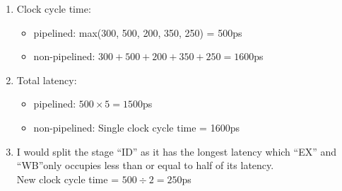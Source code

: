 \documentclass[12pt, a4paper]{article}
\begin{document}
\begin{ans}
    \begin{enumerate}
        \item Clock cycle time: 
            \begin{itemize}
                \item pipelined: max(300, 500, 200, 350, 250) = 500ps
                \item non-pipelined: $300+500+200+350+250=1600$ps
            \end{itemize}
        \item Total latency: 
            \begin{itemize}
                \item pipelined: $500 \times 5 = 1500$ps
                \item non-pipelined: Single clock cycle time = 1600ps
            \end{itemize}
        \item I would split the stage ``ID'' as it has the longest latency which ``EX'' and ``WB''only occupies less than or equal to half of its latency. \\
        New clock cycle time = $500\div 2 = 250$ps
    \end{enumerate}
\end{ans}
\end{document}
